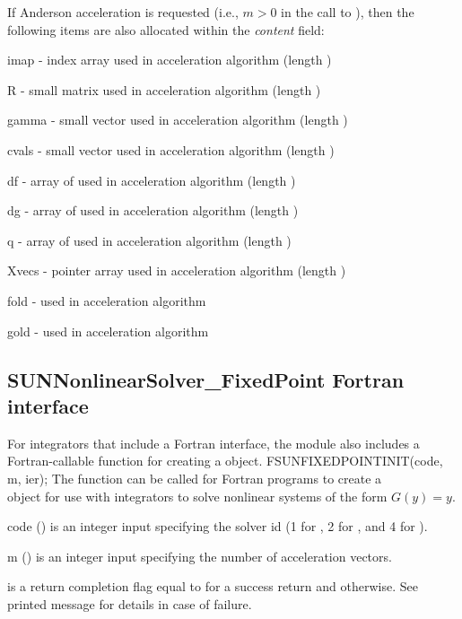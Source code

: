 \noindent If Anderson acceleration is requested (i.e., $m>0$ in the call to
), then the following items are also
allocated within the \emph{content} field:
\begin{args}[maxiters]
  \item[imap]  - index array used in acceleration algorithm (length )
  \item[R]     - small matrix used in acceleration algorithm (length )
  \item[gamma] - small vector used in acceleration algorithm (length )
  \item[cvals] - small vector used in acceleration algorithm (length )
  \item[df]    - array of  used in acceleration algorithm (length )
  \item[dg]    - array of  used in acceleration algorithm (length )
  \item[q]     - array of  used in acceleration algorithm (length )
  \item[Xvecs] -  pointer array used in acceleration algorithm (length )
  \item[fold]  -  used in acceleration algorithm
  \item[gold]  -  used in acceleration algorithm
\end{args}


\subsection{SUNNonlinearSolver\_FixedPoint Fortran interface}
\label{ss:sunnonlinsolfixedpoint_fortran}

For {\sundials} integrators that include a Fortran interface, the
{\sunnonlinsolfixedpoint} module also includes a Fortran-callable
function for creating a  object.
{
  FSUNFIXEDPOINTINIT(code, m, ier);
}
{
  The function  can be called for Fortran programs
  to create a\\
   object for use with {\sundials}
  integrators to solve nonlinear systems of the form $G(y) = y$.
}
{
  \begin{args}[code]
  \item[code] ()
    is an integer input specifying the solver id (1 for {\cvode}, 2
    for {\ida}, and 4 for {\arkode}).
  \item[m] ()
    is an integer input specifying the number of acceleration vectors.
  \end{args}
}
{
   is a return completion flag equal to  for a success
  return and  otherwise. See printed message for details in case
  of failure.
}
{}
